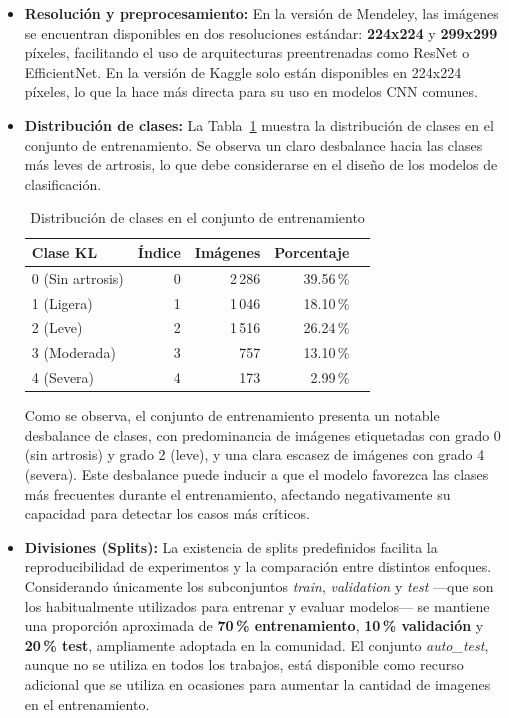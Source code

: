 \documentclass[11pt,spanish,listoffigures,listoftables]{tfgetsinf}
\begin{document}
\begin{itemize}
    \item \textbf{Resolución y preprocesamiento:} En la versión de Mendeley, las imágenes se encuentran disponibles en dos resoluciones estándar: \textbf{224x224} y 
    \textbf{299x299} píxeles, facilitando el uso de arquitecturas preentrenadas como ResNet o EfficientNet. En la versión de Kaggle solo están disponibles en 224x224
    píxeles, lo que la hace más directa para su uso en modelos CNN comunes.

    \item \textbf{Distribución de clases:} La Tabla~\ref{tab:class_distribution} muestra la distribución de clases en el conjunto de entrenamiento. Se observa un claro 
    desbalance hacia las clases más leves de artrosis, lo que debe considerarse en el diseño de los modelos de clasificación.

    \begin{table}[h]
        \centering
        \caption{Distribución de clases en el conjunto de entrenamiento}
        \label{tab:class_distribution}
        \begin{tabular}{lrrrr}
            \toprule
            \textbf{Clase KL} & \textbf{Índice} & \textbf{Imágenes} & \textbf{Porcentaje} \\
            \midrule
            0 (Sin artrosis) & 0 & 2\,286 & 39.56\,\% \\
            1 (Ligera) & 1 & 1\,046 & 18.10\,\% \\
            2 (Leve) & 2 & 1\,516 & 26.24\,\% \\
            3 (Moderada) & 3 & 757 & 13.10\,\% \\
            4 (Severa) & 4 & 173 & 2.99\,\% \\
            \bottomrule
        \end{tabular}
    \end{table}

    Como se observa, el conjunto de entrenamiento presenta un notable desbalance de clases, con predominancia de imágenes etiquetadas con 
    grado 0 (sin artrosis) y grado 2 (leve), y una clara escasez de imágenes con grado 4 (severa). Este desbalance puede inducir a que el modelo 
    favorezca las clases más frecuentes durante el entrenamiento, afectando negativamente su capacidad para detectar los casos más críticos. 

    \item \textbf{Divisiones (Splits):} La existencia de splits predefinidos facilita la reproducibilidad de experimentos y la comparación entre distintos enfoques. 
    Considerando únicamente los subconjuntos \textit{train}, \textit{validation} y \textit{test} —que son los habitualmente utilizados para entrenar y evaluar modelos— 
    se mantiene una proporción aproximada de \textbf{70\,\% entrenamiento}, \textbf{10\,\% validación} y \textbf{20\,\% test}, ampliamente adoptada en la comunidad. 
    El conjunto \textit{auto\_test}, aunque no se utiliza en todos los trabajos, está disponible como recurso adicional que se utiliza en ocasiones para aumentar la cantidad de 
    imagenes en el entrenamiento.
\end{itemize}
\end{document}
